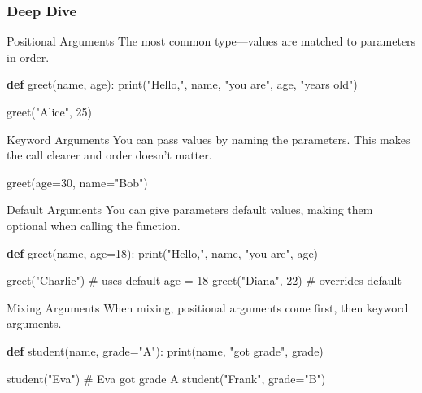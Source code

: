 \documentclass[
  letterpaper,
  DIV=11,
  numbers=noendperiod]{scrreprt}
\newenvironment{Shaded}{\begin{snugshade}}{\end{snugshade}}
\newcommand{\BuiltInTok}[1]{\textcolor[rgb]{0.00,0.23,0.31}{#1}}
\newcommand{\CommentTok}[1]{\textcolor[rgb]{0.37,0.37,0.37}{#1}}
\newcommand{\DecValTok}[1]{\textcolor[rgb]{0.68,0.00,0.00}{#1}}
\newcommand{\KeywordTok}[1]{\textcolor[rgb]{0.00,0.23,0.31}{\textbf{#1}}}
\newcommand{\NormalTok}[1]{\textcolor[rgb]{0.00,0.23,0.31}{#1}}
\newcommand{\OperatorTok}[1]{\textcolor[rgb]{0.37,0.37,0.37}{#1}}
\newcommand{\StringTok}[1]{\textcolor[rgb]{0.13,0.47,0.30}{#1}}
\begin{document}
\subsubsection{Deep Dive}\label{deep-dive-31}

Positional Arguments The most common type---values are matched to
parameters in order.

\begin{Shaded}
\begin{Highlighting}[]
\KeywordTok{def}\NormalTok{ greet(name, age):}
    \BuiltInTok{print}\NormalTok{(}\StringTok{"Hello,"}\NormalTok{, name, }\StringTok{"you are"}\NormalTok{, age, }\StringTok{"years old"}\NormalTok{)}

\NormalTok{greet(}\StringTok{"Alice"}\NormalTok{, }\DecValTok{25}\NormalTok{)}
\end{Highlighting}
\end{Shaded}

Keyword Arguments You can pass values by naming the parameters. This
makes the call clearer and order doesn't matter.

\begin{Shaded}
\begin{Highlighting}[]
\NormalTok{greet(age}\OperatorTok{=}\DecValTok{30}\NormalTok{, name}\OperatorTok{=}\StringTok{"Bob"}\NormalTok{)}
\end{Highlighting}
\end{Shaded}

Default Arguments You can give parameters default values, making them
optional when calling the function.

\begin{Shaded}
\begin{Highlighting}[]
\KeywordTok{def}\NormalTok{ greet(name, age}\OperatorTok{=}\DecValTok{18}\NormalTok{):}
    \BuiltInTok{print}\NormalTok{(}\StringTok{"Hello,"}\NormalTok{, name, }\StringTok{"you are"}\NormalTok{, age)}

\NormalTok{greet(}\StringTok{"Charlie"}\NormalTok{)      }\CommentTok{\# uses default age = 18}
\NormalTok{greet(}\StringTok{"Diana"}\NormalTok{, }\DecValTok{22}\NormalTok{)    }\CommentTok{\# overrides default}
\end{Highlighting}
\end{Shaded}

Mixing Arguments When mixing, positional arguments come first, then
keyword arguments.

\begin{Shaded}
\begin{Highlighting}[]
\KeywordTok{def}\NormalTok{ student(name, grade}\OperatorTok{=}\StringTok{"A"}\NormalTok{):}
    \BuiltInTok{print}\NormalTok{(name, }\StringTok{"got grade"}\NormalTok{, grade)}

\NormalTok{student(}\StringTok{"Eva"}\NormalTok{)            }\CommentTok{\# Eva got grade A}
\NormalTok{student(}\StringTok{"Frank"}\NormalTok{, grade}\OperatorTok{=}\StringTok{"B"}\NormalTok{)}
\end{Highlighting}
\end{Shaded}
\end{document}
